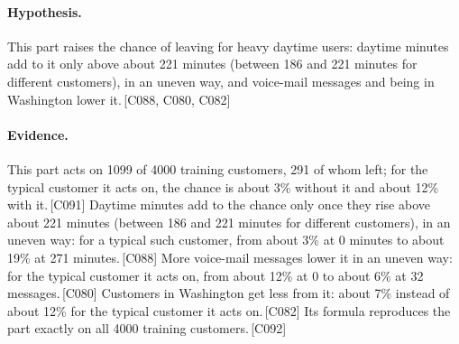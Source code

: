 \documentclass[a4paper,10pt]{article}
\newif\ifreviewmarks
\newcommand{\reviewrule}{\noindent{\color{BrickRed}\rule{\linewidth}{0.8pt}}}
\newenvironment{drafted}[1][]{%
  \ifreviewmarks\par\addvspace{\medskipamount}\reviewrule\par\nopagebreak
  \noindent{\color{BrickRed}\sffamily\footnotesize\textbf{Thesis Draft}\quad #1\hfill review}\par\nopagebreak\smallskip\fi}{%
  \ifreviewmarks\par\smallskip\noindent{\color{BrickRed}\sffamily\footnotesize end of thesis draft}\par\nopagebreak\reviewrule\par\medskip\fi}
\begin{document}
\begin{drafted}[plain-language layer: churn100-s4-c2]
\paragraph{Hypothesis.} This part raises the chance of leaving for heavy daytime users: daytime minutes add to it only above about 221 minutes (between 186 and 221 minutes for different customers), in an uneven way, and voice-mail messages and being in Washington lower it.\,{\scriptsize\textcolor{NavyBlue}{[C088, C080, C082]}}
\paragraph{Evidence.} This part acts on 1099 of 4000 training customers, 291 of whom left; for the typical customer it acts on, the chance is about 3\% without it and about 12\% with it.\,{\scriptsize\textcolor{NavyBlue}{[C091]}} Daytime minutes add to the chance only once they rise above about 221 minutes (between 186 and 221 minutes for different customers), in an uneven way: for a typical such customer, from about 3\% at 0 minutes to about 19\% at 271 minutes.\,{\scriptsize\textcolor{NavyBlue}{[C088]}} More voice-mail messages lower it in an uneven way: for the typical customer it acts on, from about 12\% at 0 to about 6\% at 32 messages.\,{\scriptsize\textcolor{NavyBlue}{[C080]}} Customers in Washington get less from it: about 7\% instead of about 12\% for the typical customer it acts on.\,{\scriptsize\textcolor{NavyBlue}{[C082]}} Its formula reproduces the part exactly on all 4000 training customers.\,{\scriptsize\textcolor{NavyBlue}{[C092]}}
\par{}
\par{}
\par{}

\end{drafted}
\end{document}
